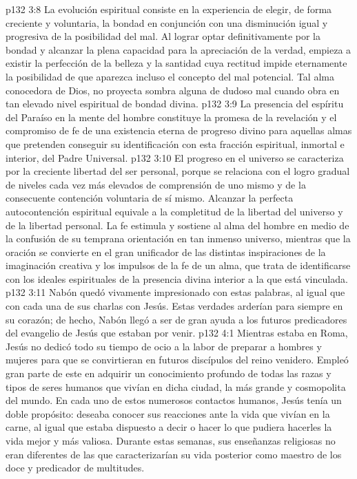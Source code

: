 \vs p132 3:8 \pc La evolución espiritual consiste en la experiencia de elegir, de forma creciente y voluntaria, la bondad en conjunción con una disminución igual y progresiva de la posibilidad del mal. Al lograr optar definitivamente por la bondad y alcanzar la plena capacidad para la apreciación de la verdad, empieza a existir la perfección de la belleza y la santidad cuya rectitud impide eternamente la posibilidad de que aparezca incluso el concepto del mal potencial. Tal alma conocedora de Dios, no proyecta sombra alguna de dudoso mal cuando obra en tan elevado nivel espiritual de bondad divina.
\vs p132 3:9 La presencia del espíritu del Paraíso en la mente del hombre constituye la promesa de la revelación y el compromiso de fe de una existencia eterna de progreso divino para aquellas almas que pretenden conseguir su identificación con esta fracción espiritual, inmortal e interior, del Padre Universal.
\vs p132 3:10 El progreso en el universo se caracteriza por la creciente libertad del ser personal, porque se relaciona con el logro gradual de niveles cada vez más elevados de comprensión de uno mismo y de la consecuente contención voluntaria de sí mismo. Alcanzar la perfecta autocontención espiritual equivale a la completitud de la libertad del universo y de la libertad personal. La fe estimula y sostiene al alma del hombre en medio de la confusión de su temprana orientación en tan inmenso universo, mientras que la oración se convierte en el gran unificador de las distintas inspiraciones de la imaginación creativa y los impulsos de la fe de un alma, que trata de identificarse con los ideales espirituales de la presencia divina interior a la que está vinculada.
\vs p132 3:11 \pc Nabón quedó vivamente impresionado con estas palabras, al igual que con cada una de sus charlas con Jesús. Estas verdades arderían para siempre en su corazón; de hecho, Nabón llegó a ser de gran ayuda a los futuros predicadores del evangelio de Jesús que estaban por venir.
\vs p132 4:1 Mientras estaba en Roma, Jesús no dedicó todo su tiempo de ocio a la labor de preparar a hombres y mujeres para que se convirtieran en futuros discípulos del reino venidero. Empleó gran parte de este en adquirir un conocimiento profundo de todas las razas y tipos de seres humanos que vivían en dicha ciudad, la más grande y cosmopolita del mundo. En cada uno de estos numerosos contactos humanos, Jesús tenía un doble propósito: deseaba conocer sus reacciones ante la vida que vivían en la carne, al igual que estaba dispuesto a decir o hacer lo que pudiera hacerles la vida mejor y más valiosa. Durante estas semanas, sus enseñanzas religiosas no eran diferentes de las que caracterizarían su vida posterior como maestro de los doce y predicador de multitudes.
